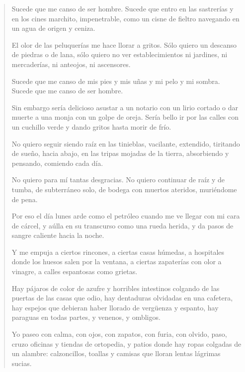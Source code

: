 \documentclass[12pt]{article}
\begin{document}
\clearpage
{}
\begin{verse}
Sucede que me canso de ser hombre.  
Sucede que entro en las sastrerías y en los cines  
marchito, impenetrable, como un cisne de fieltro  
navegando en un agua de origen y ceniza.  
	
El olor de las peluquerías me hace llorar a gritos.  
Sólo quiero un descanso de piedras o de lana,  
sólo quiero no ver establecimientos ni jardines,  
ni mercaderías, ni anteojos, ni ascensores.  
	
Sucede que me canso de mis pies y mis uñas  
y mi pelo y mi sombra.  
Sucede que me canso de ser hombre.  
	
Sin embargo sería delicioso  
asustar a un notario con un lirio cortado  
o dar muerte a una monja con un golpe de oreja.  
Sería bello  
ir por las calles con un cuchillo verde  
y dando gritos hasta morir de frío.  
	
No quiero seguir siendo raíz en las tinieblas,  
vacilante, extendido, tiritando de sueño,  
hacia abajo, en las tripas mojadas de la tierra,  
absorbiendo y pensando, comiendo cada día.  
	
No quiero para mí tantas desgracias.  
No quiero continuar de raíz y de tumba,  
de subterráneo solo, de bodega con muertos  
ateridos, muriéndome de pena.  
	
Por eso el día lunes arde como el petróleo  
cuando me ve llegar con mi cara de cárcel,  
y aúlla en su transcurso como una rueda herida,  
y da pasos de sangre caliente hacia la noche.  
	
Y me empuja a ciertos rincones, a ciertas casas húmedas,  
a hospitales donde los huesos salen por la ventana,  
a ciertas zapaterías con olor a vinagre,  
a calles espantosas como grietas.  
	
Hay pájaros de color de azufre y horribles intestinos  
colgando de las puertas de las casas que odio,  
hay dentaduras olvidadas en una cafetera,  
hay espejos  
que debieran haber llorado de vergüenza y espanto,  
hay paraguas en todas partes, y venenos, y ombligos.  
	
Yo paseo con calma, con ojos, con zapatos,  
con furia, con olvido,  
paso, cruzo oficinas y tiendas de ortopedia,  
y patios donde hay ropas colgadas de un alambre:  
calzoncillos, toallas y camisas que lloran  
lentas lágrimas sucias.  

\end{verse}
\end{document}
